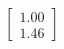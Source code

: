 \documentclass[preview]{standalone}
\begin{document}
\begin{align*}
\begin{bmatrix} 1.00 \\ 1.46 \end{bmatrix}
\end{align*}
\end{document}
